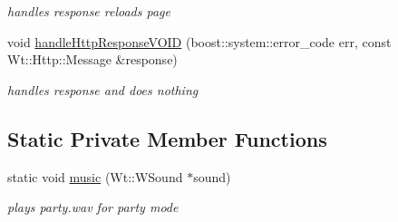 \begin{DoxyCompactItemize}
\begin{DoxyCompactList}\small\item\em handles response reloads page \end{DoxyCompactList}\item 
void \hyperlink{class_single_groups_control_widget_a8f1e4dc31eb242ce4284a1bad9d2fbcb}{handle\+Http\+Response\+V\+O\+ID} (boost\+::system\+::error\+\_\+code err, const Wt\+::\+Http\+::\+Message \&response)
\begin{DoxyCompactList}\small\item\em handles response and does nothing \end{DoxyCompactList}\end{DoxyCompactItemize}
\subsection*{Static Private Member Functions}
\begin{DoxyCompactItemize}
\item 
static void \hyperlink{class_single_groups_control_widget_adba20587e7d7afd7e7ef5d95b242579e}{music} (Wt\+::\+W\+Sound $\ast$sound)
\begin{DoxyCompactList}\small\item\em plays party.\+wav for party mode \end{DoxyCompactList}\end{DoxyCompactItemize}
